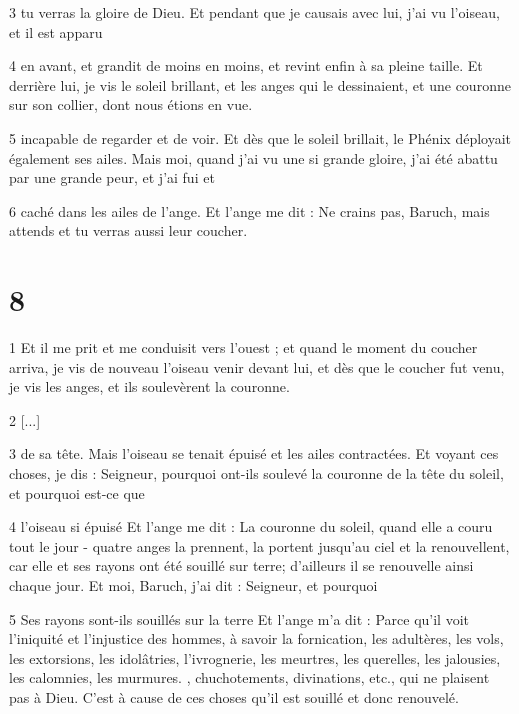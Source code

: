 \par 3 tu verras la gloire de Dieu. Et pendant que je causais avec lui, j'ai vu l'oiseau, et il est apparu

\par 4 en avant, et grandit de moins en moins, et revint enfin à sa pleine taille. Et derrière lui, je vis le soleil brillant, et les anges qui le dessinaient, et une couronne sur son collier, dont nous étions en vue.

\par 5 incapable de regarder et de voir. Et dès que le soleil brillait, le Phénix déployait également ses ailes. Mais moi, quand j'ai vu une si grande gloire, j'ai été abattu par une grande peur, et j'ai fui et

\par 6 caché dans les ailes de l'ange. Et l'ange me dit : Ne crains pas, Baruch, mais attends et tu verras aussi leur coucher.

\chapter{8}

\par 1 Et il me prit et me conduisit vers l'ouest ; et quand le moment du coucher arriva, je vis de nouveau l'oiseau venir devant lui, et dès que le coucher fut venu, je vis les anges, et ils soulevèrent la couronne.

\par 2 [...]

\par 3 de sa tête. Mais l’oiseau se tenait épuisé et les ailes contractées. Et voyant ces choses, je dis : Seigneur, pourquoi ont-ils soulevé la couronne de la tête du soleil, et pourquoi est-ce que

\par 4 l'oiseau si épuisé Et l'ange me dit : La couronne du soleil, quand elle a couru tout le jour - quatre anges la prennent, la portent jusqu'au ciel et la renouvellent, car elle et ses rayons ont été souillé sur terre; d'ailleurs il se renouvelle ainsi chaque jour. Et moi, Baruch, j'ai dit : Seigneur, et pourquoi

\par 5 Ses rayons sont-ils souillés sur la terre Et l'ange m'a dit : Parce qu'il voit l'iniquité et l'injustice des hommes, à savoir la fornication, les adultères, les vols, les extorsions, les idolâtries, l'ivrognerie, les meurtres, les querelles, les jalousies, les calomnies, les murmures. , chuchotements, divinations, etc., qui ne plaisent pas à Dieu. C'est à cause de ces choses qu'il est souillé et donc renouvelé.

